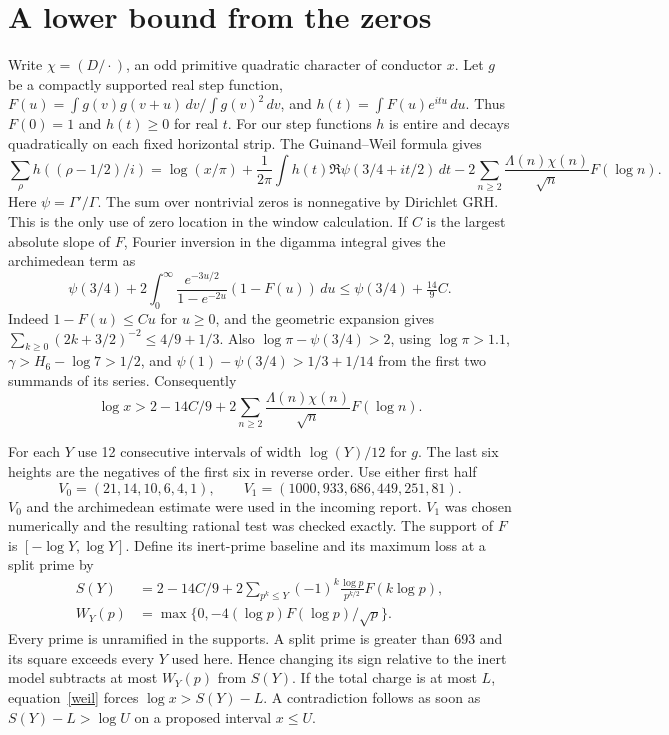 \documentclass[11pt]{article}
\begin{document}
\section{A lower bound from the zeros}
Write $\chi=(D/\cdot)$, an odd primitive quadratic character of
conductor $x$. Let $g$ be a compactly supported real step function,
$F(u)=\int g(v)g(v+u)\,dv/\int g(v)^2\,dv$, and
$h(t)=\int F(u)e^{itu}\,du$. Thus $F(0)=1$ and $h(t)\ge0$ for real
$t$. For our step functions $h$ is entire and decays quadratically on
each fixed horizontal strip. The Guinand--Weil formula \cite{explicit} gives
\[
 \sum_\rho h((\rho-1/2)/i)=\log(x/\pi)+
   \frac1{2\pi}\int h(t)\Re\psi(3/4+it/2)\,dt
       -2\sum_{n\ge2}\frac{\Lambda(n)\chi(n)}{\sqrt n}F(\log n).
\]
Here $\psi=\Gamma'/\Gamma$. The sum over nontrivial zeros is nonnegative by
Dirichlet GRH. This is the only use of zero location in the window calculation.
If $C$ is the largest absolute slope of $F$, Fourier inversion in the
digamma integral gives the archimedean term as
\[
 \psi(3/4)+2\int_0^\infty\frac{e^{-3u/2}}{1-e^{-2u}}(1-F(u))\,du
 \le\psi(3/4)+\tfrac{14}{9}C .
\]
Indeed $1-F(u)\le Cu$ for $u\ge0$, and the geometric expansion gives
$\sum_{k\ge0}(2k+3/2)^{-2}\le4/9+1/3$. Also
$\log\pi-\psi(3/4)>2$, using $\log\pi>1.1$,
$\gamma>H_6-\log7>1/2$, and
$\psi(1)-\psi(3/4)>1/3+1/14$ from the first two summands of its series.
Consequently
\begin{equation}\label{weil}
 \log x>2-14C/9+2\sum_{n\ge2}\frac{\Lambda(n)\chi(n)}{\sqrt n}F(\log n).
\end{equation}

For each $Y$ use 12 consecutive intervals of width $\log(Y)/12$ for $g$.
The last six heights are the negatives of the first six in reverse order. Use either first half
\[
 V_0=(21,14,10,6,4,1),\qquad V_1=(1000,933,686,449,251,81).
\]
$V_0$ and the archimedean estimate were used in the incoming report.
$V_1$ was chosen numerically and the resulting rational test was checked
exactly. The support of $F$ is $[-\log Y,\log Y]$. Define its inert-prime
baseline and its maximum loss at a split prime by
\begin{align*}
 S(Y)&=2-14C/9+
   2\sum_{p^k\le Y}(-1)^k\frac{\log p}{p^{k/2}}F(k\log p),\\
 W_Y(p)&=\max\{0,-4(\log p)F(\log p)/\sqrt p\}.
\end{align*}
Every prime is unramified in the supports. A split prime is greater than
693 and its square exceeds every $Y$ used here. Hence changing its sign
relative to the inert model subtracts at most $W_Y(p)$ from $S(Y)$.
If the total charge is at most $L$, equation~\eqref{weil} forces
$\log x>S(Y)-L$. A contradiction follows as soon as $S(Y)-L>\log U$
on a proposed interval $x\le U$.
\end{document}
